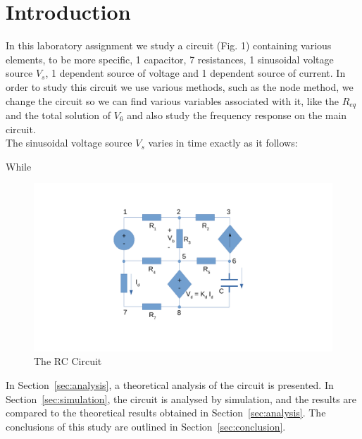 \newpage
\section{Introduction}
\label{sec:introduction}

In this laboratory assignment we study a circuit (Fig. 1) containing various elements, to be more specific, 1 capacitor, 7 resistances, 1 sinusoidal voltage source $V_s$, 1 dependent source of voltage and 1 dependent source of current. In order to study this circuit we use various methods, such as the node method, we change the circuit so we can find various variables associated with it, like the $R_{eq}$ and the total solution of $V_6$ and also study the frequency response on the main circuit.\\

The sinusoidal voltage source $V_s$ varies in time exactly as it follows:

%


While



\begin{figure}[h] 

\centering
\includegraphics[width=\textwidth]{circuit1.pdf}
\caption{The RC Circuit}
\label{fig:first}

\end{figure}


In Section~\ref{sec:analysis}, a theoretical analysis of the circuit is
presented. In Section~\ref{sec:simulation}, the circuit is analysed by
simulation, and the results are compared to the theoretical results obtained in
Section~\ref{sec:analysis}. The conclusions of this study are outlined in
Section~\ref{sec:conclusion}. \\


